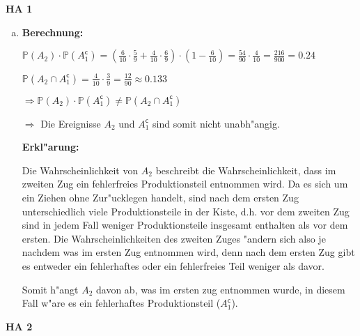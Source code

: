 \documentclass[a4paper,12pt]{article}
\newcommand{\Aufgabe}[1]{
        {
        \vspace*{0.5cm}
        \textbf{HA #1}
        \vspace*{0.2cm}
    }
}
\begin{document}
    \Aufgabe{1}

    \begin{enumerate}[(b)]
        \item 

        \textbf{Berechnung:}

        $ \displaystyle \mathbb{P}(A_2) \cdot \mathbb{P}(A_1^{\mathsf{c}}) = (\frac{6}{10} \cdot \frac{5}{9} + \frac{4}{10} \cdot \frac{6}{9}) \cdot (1 - \frac{6}{10}) = \frac{54}{90} \cdot \frac{4}{10} = \frac{216}{900} = 0.24 $

        $ \displaystyle \mathbb{P}(A_2 \cap A_1^{\mathsf{c}}) = \frac{4}{10} \cdot \frac{3}{9} = \frac{12}{90} \approx 0.133 $

        $ \Rightarrow \mathbb{P}(A_2) \cdot \mathbb{P}(A_1^{\mathsf{c}}) \neq \mathbb{P}(A_2 \cap A_1^{\mathsf{c}}) $ 
        
        $\Rightarrow $ Die Ereignisse $ A_2 $ und $ A_1^{\mathsf{c}} $ sind somit nicht unabh"angig.

        \bigskip

        \textbf{Erkl"arung:}

        Die Wahrscheinlichkeit von $ A_2 $ beschreibt die Wahrscheinlichkeit, dass im zweiten Zug ein fehlerfreies Produktionsteil entnommen wird.
        Da es sich um ein Ziehen ohne Zur"ucklegen handelt, sind nach dem ersten Zug unterschiedlich viele Produktionsteile in der Kiste, d.h. vor dem zweiten
        Zug sind in jedem Fall weniger Produktionsteile insgesamt enthalten als vor dem ersten. Die Wahrscheinlichkeiten des zweiten Zuges "andern sich also je nachdem 
        was im ersten Zug entnommen wird, denn nach dem ersten Zug gibt es entweder ein fehlerhaftes oder ein fehlerfreies Teil weniger als davor. 
        
        Somit h"angt $ A_2 $ davon ab, was im ersten zug entnommen wurde, in diesem Fall w"are es ein fehlerhaftes Produktionsteil ($ A_1^{\mathsf{c}} $).
    \end{enumerate}

    \Aufgabe{2}
\end{document}
